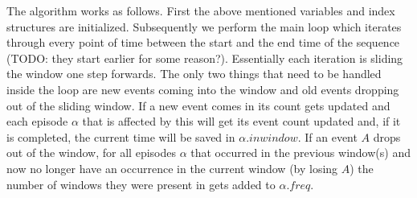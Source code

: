 The algorithm works as follows. First the above mentioned variables and index structures are initialized. Subsequently we perform the main loop which iterates through every point of time between the start and the end time of the sequence (TODO: they start earlier for some reason?). Essentially each iteration is sliding the window one step forwards. The only two things that need to be handled inside the loop are new events coming into the window and old events dropping out of the sliding window. If a new event comes in its count gets updated and each episode $\alpha$ that is affected by this will get its event count updated and, if it is completed, the current time will be saved in $\alpha. inwindow$. \newline
If an event $A$ drops out of the window, for all episodes $\alpha$ that occurred in the previous window(s) and now no longer have an occurrence in the current window (by losing $A$) the number of windows they were present in gets added to $\alpha .freq$.

